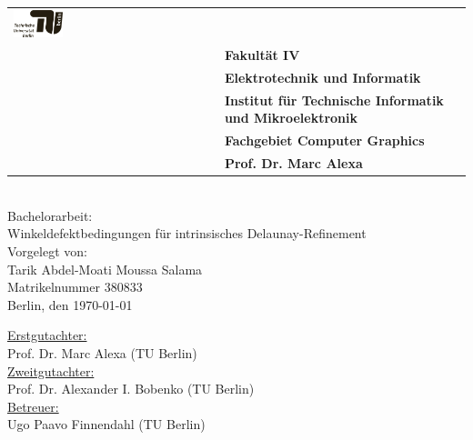 \begin{titlepage}
	\sffamily
    \raggedleft
	\small
	\begin{center}		
		\color{gray}
		\begin{tabularx}{\textwidth}{R{0.5\textwidth}L{0.5\textwidth}}
			\includegraphics[width=0.25\textwidth]{images/Logo_TU.pdf}&\\
			&\textbf{Fakultät IV}\\
			&\textbf{Elektrotechnik und Informatik}\\
			&\textbf{Institut für Technische Informatik und Mikroelektronik}\\
			&\textbf{Fachgebiet Computer Graphics}\\
			&\textbf{Prof. Dr. Marc Alexa}\\
		\end{tabularx}	
	\end{center}
	\mbox{}\vspace{2\baselineskip}\\
	\sffamily\huge
	\centering   
	Bachelorarbeit:\vspace{0.25\baselineskip}\\
	\sffamily\Huge
Winkeldefektbedingungen für intrinsisches Delaunay-Refinement  \vspace{1.5\baselineskip}\\
	\sffamily\normalsize
	Vorgelegt von:\vspace{0.5\baselineskip}\\	
	Tarik Abdel-Moati Moussa Salama\vspace{0.25\baselineskip}\\
	Matrikelnummer 380833\vspace{0.25\baselineskip}\\
	
	\sffamily\large
	Berlin, den \today
	\vspace{3\baselineskip}\\

   \vfill
   \raggedright
   \small 
   \centering
	\vfill	
	\uline{Erstgutachter:}\vspace{0.25\baselineskip}\\
	Prof. Dr. Marc Alexa (TU Berlin)\vspace{0.5\baselineskip}\\
	\uline{Zweitgutachter:}\vspace{0.25\baselineskip}\\
	Prof. Dr. Alexander I. Bobenko (TU Berlin)
	\vspace{2\baselineskip}\\
	\uline{Betreuer:}\vspace{0.25\baselineskip}\\
	Ugo Paavo Finnendahl (TU Berlin)\vspace{0.25\baselineskip}\\

\end{titlepage}
